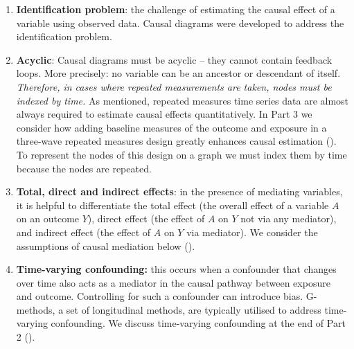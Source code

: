 \documentclass[
  singlecolumn]{article}
\begin{document}
\begin{enumerate}
\def\labelenumi{\arabic{enumi}.}
\setcounter{enumi}{12}
\item
  \textbf{Identification problem}: the challenge of estimating the
  causal effect of a variable using observed data. Causal diagrams were
  developed to address the identification problem.
\item
  \textbf{Acyclic}: Causal diagrams must be acyclic -- they cannot
  contain feedback loops. More precisely: no variable can be an ancestor
  or descendant of itself. \emph{Therefore, in cases where repeated
  measurements are taken, nodes must be indexed by time.} As mentioned,
  repeated measures time series data are almost always required to
  estimate causal effects quantitatively. In Part 3 we consider how
  adding baseline measures of the outcome and exposure in a three-wave
  repeated measures design greatly enhances causal estimation
  (). To represent the nodes of
  this design on a graph we must index them by time because the nodes
  are repeated.
\item
  \textbf{Total, direct and indirect effects}: in the presence of
  mediating variables, it is helpful to differentiate the total effect
  (the overall effect of a variable \(A\) on an outcome \(Y\)), direct
  effect (the effect of \(A\) on \(Y\) not via any mediator), and
  indirect effect (the effect of \(A\) on \(Y\) via mediator). We
  consider the assumptions of causal mediation below
  ().
\item
  \textbf{Time-varying confounding:} this occurs when a confounder that
  changes over time also acts as a mediator in the causal pathway
  between exposure and outcome. Controlling for such a confounder can
  introduce bias. G-methods, a set of longitudinal methods, are
  typically utilised to address time-varying confounding. We discuss
  time-varying confounding at the end of Part 2
  ().
\end{enumerate}
\end{document}
